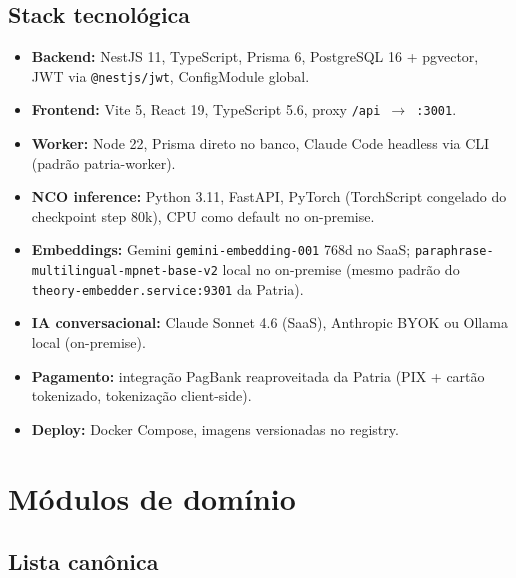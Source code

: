 \documentclass[11pt,a4paper]{article}
\begin{document}
\subsection{Stack tecnológica}

\begin{itemize}[leftmargin=2em]
  \item \textbf{Backend:} NestJS 11, TypeScript, Prisma 6, PostgreSQL 16 +
        pgvector, JWT via \texttt{@nestjs/jwt}, ConfigModule global.
  \item \textbf{Frontend:} Vite 5, React 19, TypeScript 5.6, proxy
        \texttt{/api $\to$ :3001}.
  \item \textbf{Worker:} Node 22, Prisma direto no banco, Claude Code
        headless via CLI (padrão patria-worker).
  \item \textbf{NCO inference:} Python 3.11, FastAPI, PyTorch (TorchScript
        congelado do checkpoint step 80k), CPU como default no on-premise.
  \item \textbf{Embeddings:} Gemini \texttt{gemini-embedding-001} 768d no
        SaaS; \texttt{paraphrase-multilingual-mpnet-base-v2} local no
        on-premise (mesmo padrão do
        \texttt{theory-embedder.service:9301} da Patria).
  \item \textbf{IA conversacional:} Claude Sonnet 4.6 (SaaS), Anthropic
        BYOK ou Ollama local (on-premise).
  \item \textbf{Pagamento:} integração PagBank reaproveitada da Patria
        (PIX + cartão tokenizado, tokenização client-side).
  \item \textbf{Deploy:} Docker Compose, imagens versionadas no registry.
\end{itemize}

\section{Módulos de domínio}

\subsection{Lista canônica}
\end{document}
